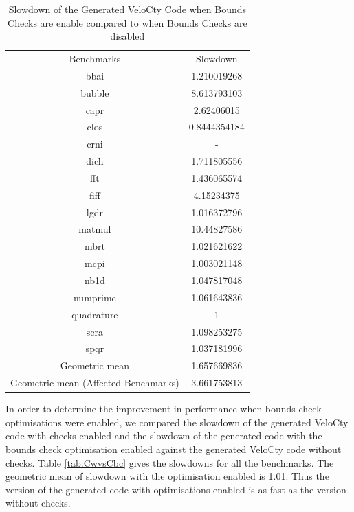 \begin{table}[htbp]
\centering
\begin{tabular}{|c|c|}
\hline
Benchmarks                           & Slowdown     \\ \hhline{|=|=|}
bbai                                 & 1.210019268  \\ \hline
bubble                               & 8.613793103  \\ \hline
capr                                 & 2.62406015   \\ \hline
clos                                 & 0.8444354184 \\ \hline
crni                                 & -            \\ \hline
dich                                 & 1.711805556  \\ \hline
fft                                  & 1.436065574  \\ \hline
fiff                                 & 4.15234375   \\ \hline
lgdr                                 & 1.016372796  \\ \hline
matmul                               & 10.44827586  \\ \hline
mbrt                                 & 1.021621622  \\ \hline
mcpi                                 & 1.003021148  \\ \hline
nb1d                                 & 1.047817048  \\ \hline
numprime                             & 1.061643836  \\ \hline
quadrature                           & 1            \\ \hline
scra                                 & 1.098253275  \\ \hline
spqr                                 & 1.037181996  \\ \hline
Geometric mean                       & 1.657669836  \\ \hline
Geometric mean (Affected Benchmarks) & 3.661753813  \\ \hline
\end{tabular}
\caption{Slowdown of the Generated VeloCty Code when Bounds Checks are enable compared to when Bounds Checks are disabled}
\label{tab:CwovsCw}
\end{table}
In order to determine the improvement in performance when bounds check optimisations were enabled, we compared the slowdown of the generated VeloCty code with checks enabled  and the slowdown of the generated code with the bounds check optimisation enabled against the generated VeloCty code without checks. Table \ref{tab:CwvsCbc} gives the slowdowns for all the benchmarks. The geometric mean of slowdown with the optimisation enabled is 1.01. Thus the version of the generated code with optimisations enabled is as fast as the version without checks. 
